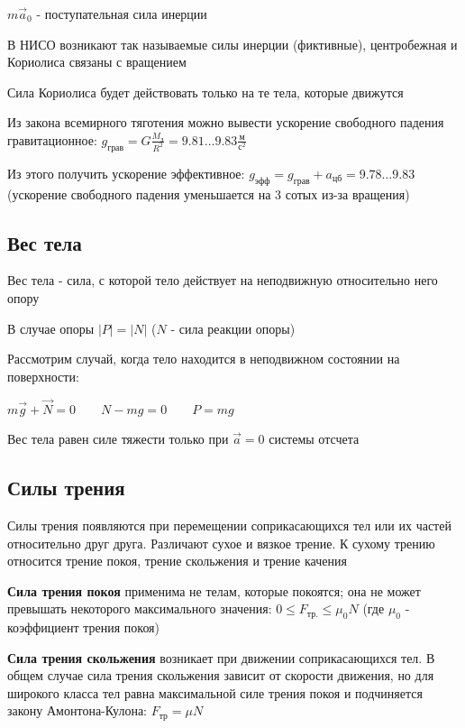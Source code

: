\documentclass[12pt]{article}
\begin{document}
    $m\vec{a}_0$ - поступательная сила инерции


    В НИСО возникают так называемые силы инерции (фиктивные), центробежная и Кориолиса связаны с вращением

    Сила Кориолиса будет действовать только на те тела, которые движутся

    Из закона всемирного тяготения можно вывести ускорение свободного падения гравитационное: $g_{\text{грав}} = G \frac{M_\text{З}}{R^2} = 9.81\dots9.83 \frac{\text{м}}{\text{с}^2}$

    Из этого получить ускорение эффективное: $g_\text{эфф} = g_\text{грав} + a_\text{цб} = 9.78\dots9.83$ (ускорение свободного падения уменьшается на 3 сотых из-за вращения)

    \subsection{Вес тела}

    \Def Вес тела - сила, с которой тело действует на неподвижную относительно него опору

    В случае опоры $|P| = |N|$ ($N$ - сила реакции опоры)

    Рассмотрим случай, когда тело находится в неподвижном состоянии на поверхности:

    $m\vec{g} + \vec{N} = 0 \quad\quad N - mg = 0 \quad\quad P = mg$

    Вес тела равен силе тяжести только при $\vec{a} = 0$ системы отсчета

    \subsection{Силы трения}

    Силы трения появляются при перемещении соприкасающихся тел или их частей относительно друг друга.
    Различают сухое и вязкое трение. К сухому трению относится трение покоя, трение скольжения и трение качения

    \textbf{Сила трения покоя} применима не телам, которые покоятся; она не может превышать некоторого максимального значения: $0 \leq F_\text{тр.} \leq \mu_0 N$ (где $\mu_0$ - коэффициент трения покоя)

    \textbf{Сила трения скольжения} возникает при движении соприкасающихся тел. В общем случае сила трения скольжения зависит
    от скорости движения, но для широкого класса тел равна максимальной силе трения покоя и подчиняется закону Амонтона-Кулона: $F_\text{тр} = \mu N$
\end{document}
